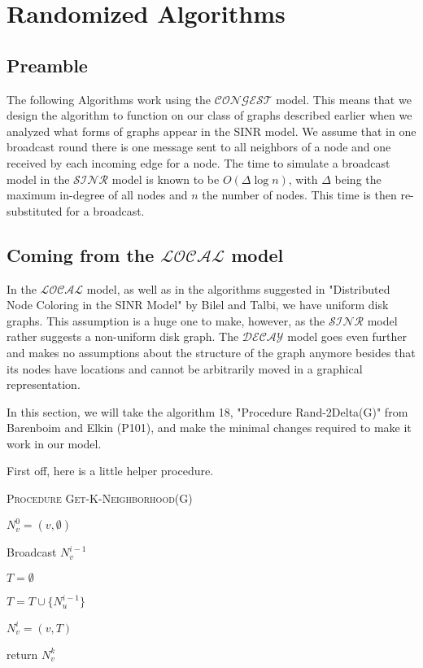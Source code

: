 \chapter{Randomized Algorithms}
\label{ch:randomizedAlgorithms}

\section{Preamble}
The following Algorithms work using the $\mathcal{CONGEST}$ model. This means that we design the algorithm to function on our class of graphs described earlier when we analyzed what forms of graphs appear in the SINR model. We assume that in one broadcast round there is one message sent to all neighbors of a node and one received by each incoming edge for a node. The time to simulate a broadcast model in the $\mathcal{SINR}$ model is known to be $O(\Delta \log{n})$, with $\Delta$ being the maximum in-degree of all nodes and $n$ the number of nodes. This time is then re-substituted for a broadcast.

\section{Coming from the $\mathcal{LOCAL}$ model}
In the $\mathcal{LOCAL}$ model, as well as in the algorithms suggested in "Distributed Node Coloring in the SINR Model" by Bilel and Talbi, we have uniform disk graphs. This assumption is a huge one to make, however, as the $\mathcal{SINR}$ model rather suggests a non-uniform disk graph. The $\mathcal{DECAY}$ model goes even further and makes no assumptions about the structure of the graph anymore besides that its nodes have locations and cannot be arbitrarily moved in a graphical representation.

In this section, we will take the algorithm 18, "Procedure Rand-2Delta(G)" from Barenboim and Elkin (P101), and make the minimal changes required to make it work in our model.

First off, here is a little helper procedure.


\begin{algorithm}[bt]
\DontPrintSemicolon 
\caption{\textsc{Procedure Get-K-Neighborhood(G)}}\label{alg:k-nghbr}

$N^0_v = (v, \emptyset)$\;

{

Broadcast $N^{i-1}_v$\;

$T = \emptyset$ \;

{
$T = T \cup \{N^{i-1}_u\}$\;

$N^{i}_v = (v, T)$\;


}


}

return $N^k_v$

\end{algorithm}

